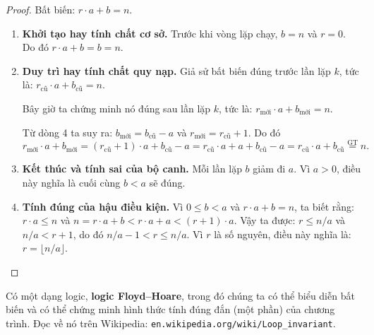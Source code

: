 \begin{proof}
Bất biến: $r \cdot a + b = n$.

\begin{enumerate}
\item \textbf{Khởi tạo hay tính chất cơ sở.} Trước khi vòng lặp chạy, $b = n$ và $r = 0$. Do đó $r \cdot a + b = b = n$.

\item \textbf{Duy trì hay tính chất quy nạp.} Giả sử bất biến đúng trước lần lặp $k$, tức là: $r_{\text{cũ}} \cdot a + b_{\text{cũ}} = n$.

Bây giờ ta chứng minh nó đúng sau lần lặp $k$, tức là: $r_{\text{mới}} \cdot a + b_{\text{mới}} = n$.

Từ dòng 4 ta suy ra: $b_{\text{mới}} = b_{\text{cũ}} - a$ và $r_{\text{mới}} = r_{\text{cũ}} + 1$. Do đó
\[r_{\text{mới}} \cdot a + b_{\text{mới}} = (r_{\text{cũ}} + 1) \cdot a + b_{\text{cũ}} - a = r_{\text{cũ}} \cdot a + a + b_{\text{cũ}} - a = r_{\text{cũ}} \cdot a + b_{\text{cũ}} \stackrel{\text{GT}}{=} n.\]

\item \textbf{Kết thúc và tính sai của bộ canh.} Mỗi lần lặp $b$ giảm đi $a$. Vì $a > 0$, điều này nghĩa là cuối cùng $b < a$ sẽ đúng.

\item \textbf{Tính đúng của hậu điều kiện.} Vì $0 \leq b < a$ và $r \cdot a + b = n$, ta biết rằng: $r \cdot a \leq n$ và $n = r \cdot a + b < r \cdot a + a < (r + 1) \cdot a$. Vậy ta được: $r \leq n/a$ và $n/a < r + 1$, do đó $n/a - 1 < r \leq n/a$. Vì $r$ là số nguyên, điều này nghĩa là: $r = \lfloor n/a \rfloor$.
\end{enumerate}
\end{proof}

\begin{infobox}
Có một dạng logic, \textbf{logic Floyd--Hoare}, trong đó chúng ta có thể biểu diễn bất biến và có thể chứng minh hình thức tính đúng đắn (một phần) của chương trình. Đọc về nó trên Wikipedia: \texttt{en.wikipedia.org/wiki/Loop\_invariant}.
\end{infobox}
